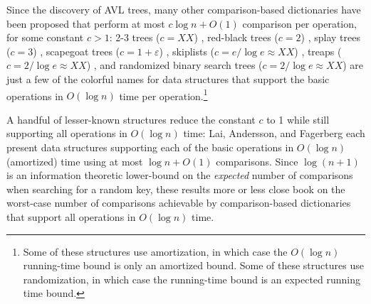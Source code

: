 \documentclass{patmorin}
\newcommand{\eps}{\varepsilon}
\begin{document}
Since the discovery of AVL trees, many other comparison-based dictionaries
have been proposed that perform at most $c\log n + O(1)$ comparison per
operation, for some constant $c>1$:  2-3 trees ($c=XX$) \cite{X}, red-black
trees ($c=2$) \cite{X}, splay trees ($c=3$) \cite{X}, scapegoat trees
($c=1+\eps$) \cite{X, Y}, skiplists ($c=e/\log e\approx XX$) \cite{X,Y}, treaps
($c=2/\log e\approx XX$) \cite{X,Y}, and randomized binary search trees
($c=2/\log e\approx XX$) \cite{X} are just a few of the colorful names
for data structures that support the basic operations in $O(\log n)$
time per operation.\footnote{Some of these structures use amortization,
in which case the $O(\log n)$ running-time bound is only an amortized
bound.  Some of these structures use randomization, in which case the
running-time bound is an expected running time bound.} 

A handful of lesser-known structures reduce the constant $c$ to 1 while
still supporting all operations in $O(\log n)$ time: Lai, Andersson,
and Fagerberg \cite{X,Y,Z} each present data structures supporting
each of the basic operations in $O(\log n)$ (amortized) time using at
most $\log n + O(1)$ comparisons.  Since $\log(n+1)$ is an information
theoretic lower-bound on the \emph{expected} number of comparisons when
searching for a random key, these results more or less close book on
the worst-case number of comparisons achievable by comparison-based
dictionaries that support all operations in $O(\log n)$ time.



\end{document}
